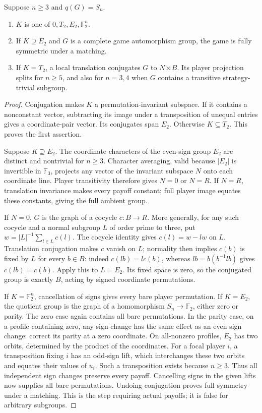 \begin{lemma}\label{lem:ternary-sign-kernels}
Suppose $n\geq3$ and $q(G)=S_n$.
\begin{enumerate}
\item $K$ is one of $0,T_2,E_2,\mathbb F_2^n$.
\item If $K\supseteq E_2$ and $G$ is a complete game automorphism group,
the game is fully symmetric under a matching.
\item If $K=T_2$, a local translation conjugates $G$ to $N\rtimes B$.
Its player projection splits for $n\geq5$, and also for $n=3,4$ when
$G$ contains a transitive strategy-trivial subgroup.
\end{enumerate}
\end{lemma}
\begin{proof}
Conjugation makes $K$ a permutation-invariant subspace. If it contains a
nonconstant vector, subtracting its image under a transposition of unequal
entries gives a coordinate-pair vector. Its conjugates span $E_2$.
Otherwise $K\subseteq T_2$. This proves the first assertion.

Suppose $K\supseteq E_2$. The coordinate characters of the even-sign
group $E_2$ are distinct and nontrivial for $n\geq3$. Character averaging,
valid because $|E_2|$ is invertible in $\mathbb F_3$, projects any vector
of the invariant subspace $N$ onto each coordinate line. Player
transitivity therefore gives $N=0$ or $N=R$. If $N=R$, translation
invariance makes every payoff constant; full player image equates these
constants, giving the full ambient group.

If $N=0$, $G$ is the graph of a cocycle $c:B\to R$. More generally,
for any such cocycle and a normal subgroup $L$ of order prime to three,
put $w=|L|^{-1}\sum_{l\in L}c(l)$. The cocycle identity gives
$c(l)=w-lw$ on $L$. Translation conjugation makes $c$ vanish on $L$;
normality then implies $c(b)$ is fixed by $L$ for every $b\in B$: indeed
$c(lb)=l c(b)$, whereas $lb=b(b^{-1}lb)$ gives $c(lb)=c(b)$.
Apply this to $L=E_2$. Its fixed space is zero, so the conjugated group
is exactly $B$, acting by signed coordinate permutations.

If $K=\mathbb F_2^n$, cancellation of signs gives every bare player
permutation. If $K=E_2$, the quotient group is the graph of a homomorphism
$S_n\to\mathbb F_2$, either zero or parity. The zero case again contains
all bare permutations. In the parity case, on a profile containing zero,
any sign change has the same effect as an even sign change: correct its
parity at a zero coordinate. On all-nonzero profiles, $E_2$ has two orbits,
determined by the product of the coordinates. For a focal player $i$,
a transposition fixing $i$ has an odd-sign lift, which interchanges these
two orbits and equates their values of $u_i$. Such a transposition exists
because $n\geq3$. Thus all independent sign changes preserve every payoff.
Cancelling signs in the given lifts now supplies all bare permutations.
Undoing conjugation proves full symmetry under a matching. This is the
step requiring actual payoffs; it is false for arbitrary subgroups.


\end{proof}
